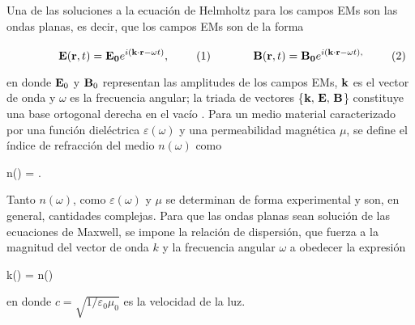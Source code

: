 \noindent Una de las soluciones a la ecuación de Helmholtz para los campos EMs son las ondas planas, es decir, que los campos EMs son de la forma \cite{jackson1999electrodynamics} 

	\begin{subequations}\eqhalf{\vb{E}(\vb{r},t) =\vb{E_0}e^{i(\vb{k}\cdot\vb{r} -\omega t)},}
	\eqhalf{\vb{B}(\vb{r}, t) =\vb{B_0}e^{i(\vb{k}\cdot\vb{r} -\omega t),}}	
	\label{eqs:ondasPlanas}\end{subequations}\vspace*{-1em}
		
\noindent en donde  $\vb{E}_0$ y $\vb{B}_0$ representan las amplitudes de los campos EMs, $\vb{k}$ es el vector de onda y $\omega$ es la frecuencia angular; la triada de vectores \{$\vb{k},\, \vb{E},\, \vb{B}$\} constituye una base ortogonal derecha en el vacío \cite{griffiths2013electrodynamics}. Para un medio material caracterizado por una función dieléctrica $\varepsilon(\omega)$ y una permeabilidad magnética $\mu$, se define el índice de refracción del medio $n(\omega)$ como \vspace*{-.75em}
%
	\begin{tcolorbox}[title = Índice de refracción, ams align]
	n(\omega) = .
		\label{eq:indice} 
	\end{tcolorbox}\vspace*{-.75em}\noindent
%
Tanto $n(\omega)$, como $\varepsilon(\omega)$ y $\mu$ se determinan de forma experimental y son, en general, cantidades complejas. Para que las ondas planas sean solución de las ecuaciones de Maxwell, se impone la relación de dispersión, que fuerza a  la magnitud del vector de onda $k$ y la frecuencia angular $\omega$ a obedecer la expresión \vspace*{-.75em}
%
	\begin{tcolorbox}[title = Relación de dispersión, ams align]
	k(\omega) = n(\omega)
	\label{eq:dispersion}
	\end{tcolorbox}\vspace*{-.75em}\noindent
%
en donde  $c=\sqrt{1/\varepsilon_0\mu_0}$ es la velocidad de la luz.

